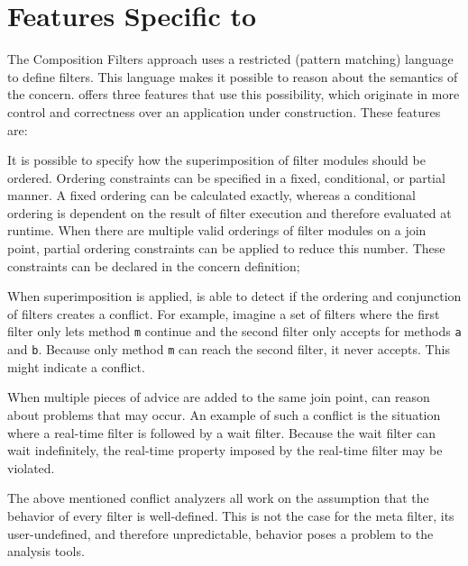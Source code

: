 \section{Features Specific to \Compose*{}}
\label{section:FSTC}
The Composition Filters approach uses a restricted (pattern matching) language to define filters. This language makes it possible to reason about the semantics of the concern. 
\Compose* offers three features that use this possibility, which originate in more control and correctness over an application under construction. These features are:
\begin{description}[style=nextline,noitemsep]
\item [Ordering of filter modules] It is possible to specify how the superimposition of filter modules should be ordered. Ordering constraints can be specified in a fixed, conditional, or partial manner. A fixed ordering can be calculated exactly, whereas a conditional ordering is dependent on the result of filter execution and therefore evaluated at runtime. When there are multiple valid orderings of filter modules on a join point, partial ordering constraints can be applied to reduce this number. These constraints can be declared in the concern definition;
\item [Filter consistency checking] When superimposition is applied, \Compose* is able to detect if the ordering and conjunction of filters creates a conflict. 
For example, imagine a set of filters where the first filter only lets method \lstinline|m| continue and the second filter only accepts for methods \lstinline|a| and \lstinline|b|. Because only method \lstinline|m| can reach the second filter, it never accepts. This might indicate a conflict.
\item [Reason about semantic problems] When multiple pieces of advice are added to the same join point, \Compose* can reason about problems that may occur.
An example of such a conflict is the situation where a real-time filter is followed by a wait filter. Because the wait filter can wait indefinitely, the real-time property imposed by the real-time filter may be violated.
\end{description}
The above mentioned conflict analyzers all work on the assumption that the behavior of every filter is well-defined. This is not the case for the meta filter, its user-undefined, and therefore unpredictable, behavior poses a problem to the analysis tools. 


